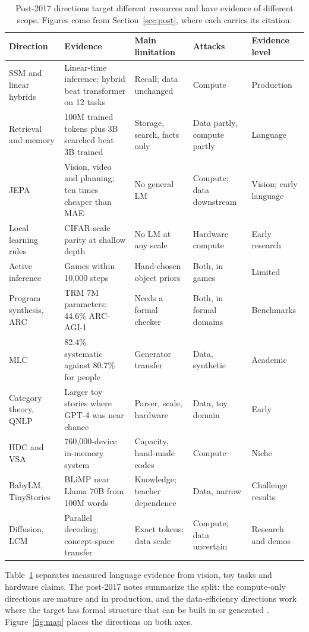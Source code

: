 \begin{table}[ht]
\centering\scriptsize
\begin{tabular}{p{2.7cm}p{3.6cm}p{2.6cm}p{2.3cm}p{2.1cm}}
\toprule
Direction & Evidence & Main limitation & Attacks & Evidence level \\
\midrule
SSM and linear hybrids & Linear-time inference; hybrid beat transformer on 12 tasks & Recall; data unchanged & Compute & Production \\
Retrieval and memory & 100M trained tokens plus 3B searched beat 3B trained & Storage, search, facts only & Data partly, compute partly & Language \\
JEPA & Vision, video and planning; ten times cheaper than MAE & No general LM & Compute; data downstream & Vision; early language \\
Local learning rules & CIFAR-scale parity at shallow depth & No LM at any scale & Hardware compute & Early research \\
Active inference & Games within 10,000 steps & Hand-chosen object priors & Both, in games & Limited \\
Program synthesis, ARC & TRM 7M parameters: 44.6\% ARC-AGI-1 & Needs a formal checker & Both, in formal domains & Benchmarks \\
MLC & 82.4\% systematic against 80.7\% for people & Generator transfer & Data, synthetic & Academic \\
Category theory, QNLP & Larger toy stories where GPT-4 was near chance & Parser, scale, hardware & Data, toy domain & Early \\
HDC and VSA & 760,000-device in-memory system & Capacity, hand-made codes & Compute & Niche \\
BabyLM, TinyStories & BLiMP near Llama 70B from 100M words & Knowledge; teacher dependence & Data, narrow & Challenge results \\
Diffusion, LCM & Parallel decoding; concept-space transfer & Exact tokens; data scale & Compute; data uncertain & Research and demos \\
\bottomrule
\end{tabular}
\caption{Post-2017 directions target different resources and have evidence of different scope. Figures come from Section~\ref{sec:post}, where each carries its citation.}
\label{tab:post}
\end{table}

Table~\ref{tab:post} separates measured language evidence from vision, toy tasks and hardware claims. The post-2017 notes summarize the split: the compute-only directions are mature and in production, and the data-efficiency directions work where the target has formal structure that can be built in or generated \cite{post65,post68,post47,post70}. Figure~\ref{fig:map} places the directions on both axes.

